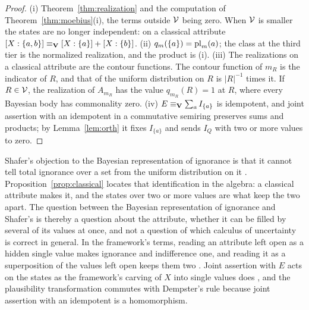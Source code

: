 \begin{proof}
(i) Theorem~\ref{thm:realization} and the computation of Theorem~\ref{thm:moebius}(i), the terms outside $\mathcal{V}$ being zero. When $\mathcal{V}$ is smaller the states are no longer independent: on a classical attribute $[X:\{a,b\}] \equiv_{\mathbf{V}} [X:\{a\}] + [X:\{b\}]$. (ii) $q_m(\{a\}) = \mathrm{pl}_m(a)$; the class at the third tier is the normalized realization, and the product is (i). (iii) The realizations on a classical attribute are the contour functions. The contour function of $m_R$ is the indicator of $R$, and that of the uniform distribution on $R$ is $|R|^{-1}$ times it. If $R \in \mathcal{V}$, the realization of $A_{m_R}$ has the value $q_{m_R}(R) = 1$ at $R$, where every Bayesian body has commonality zero. (iv) $E \equiv_{\mathbf{V}} \sum_a I_{\{a\}}$ is idempotent, and joint assertion with an idempotent in a commutative semiring preserves sums and products; by Lemma~\ref{lem:orth} it fixes $I_{\{a\}}$ and sends $I_Q$ with two or more values to zero.
\end{proof}

Shafer's objection to the Bayesian representation of ignorance is that it cannot tell total ignorance over a set from the uniform distribution on it \cite{shafer1976}. Proposition~\ref{prop:classical} locates that identification in the algebra: a classical attribute makes it, and the states over two or more values are what keep the two apart. The question between the Bayesian representation of ignorance and Shafer's is thereby a question about the attribute, whether it can be filled by several of its values at once, and not a question of which calculus of uncertainty is correct in general. In the framework's terms, reading an attribute left open as a hidden single value makes ignorance and indifference one, and reading it as a superposition of the values left open keeps them two \cite{AethusTree, AethusBrief}. Joint assertion with $E$ acts on the states as the framework's carving of $X$ into single values does \cite{Aethus}, and the plausibility transformation commutes with Dempster's rule because joint assertion with an idempotent is a homomorphism.

